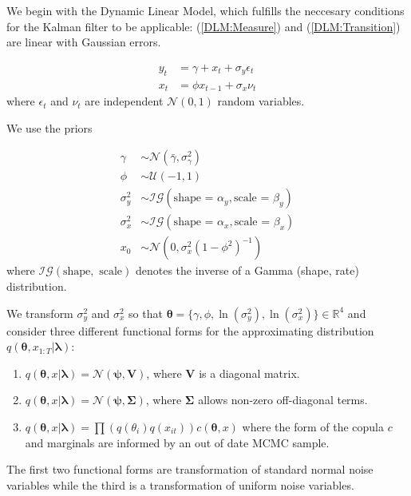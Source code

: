 \documentclass[12pt,a4paper]{article}%
\numberwithin{equation}{section}
\begin{document}
We begin with the Dynamic Linear Model, which fulfills the neccesary conditions for the Kalman filter to be applicable: (\ref{DLM:Measure}) and (\ref{DLM:Transition}) are linear with Gaussian errors.

\begin{align}
y_t &= \gamma + x_t + \sigma_y \epsilon_t \label{DLM:Measure}\\
x_t &= \phi x_{t-1} + \sigma_x \nu_t \label{DLM:Transition}
\end{align}
where $\epsilon_t$ and $\nu_t$ are independent $\mathcal{N}(0, 1)$ random variables.

We use the priors

\begin{align}
\gamma &\sim \mathcal{N}(\bar{\gamma}, \sigma^2_{\gamma}) \\
\phi &\sim \mathcal{U}(-1, 1) \\
\sigma^2_y &\sim \mathcal{IG}(\mbox{shape = }\alpha_y, \mbox{scale = }\beta_y) \\
\sigma^2_x &\sim \mathcal{IG}(\mbox{shape = }\alpha_x, \mbox{scale = }\beta_x) \\
x_0 &\sim \mathcal{N}(0, \sigma^2_x(1 - \phi^2)^{-1})
\end{align}
where $\mathcal{IG}(\mbox{shape}, \mbox{ scale})$ denotes the inverse of a Gamma (shape, rate) distribution.

We transform $\sigma^2_y$ and $\sigma^2_x$ so that $\boldsymbol{\theta} = \{\gamma, \phi, \ln(\sigma^2_y), \ln(\sigma^2_x) \} \in \mathbb{R}^4$ and consider three different functional forms for the approximating distribution $q(\boldsymbol{\theta}, x_{1:T} | \boldsymbol{\lambda})$:
\begin{enumerate}
\item $q(\boldsymbol{\theta}, x | \boldsymbol{\lambda}) = \mathcal{N}(\boldsymbol{\psi}, \textbf{V})$, where $\textbf{V}$ is a diagonal matrix.
\item $q(\boldsymbol{\theta}, x | \boldsymbol{\lambda}) = \mathcal{N}(\boldsymbol{\psi}, \boldsymbol{\Sigma})$, where $\boldsymbol{\Sigma}$ allows non-zero off-diagonal terms.
\item  $q(\boldsymbol{\theta}, x | \boldsymbol{\lambda}) = \prod \left(q(\theta_i) q(x_{it})\right) c(\boldsymbol{\theta}, x)$ where the form of the copula $c$ and marginals are informed by an out of date MCMC sample.
\end{enumerate}
The first two functional forms are transformation of standard normal noise variables while the third is a transformation of uniform noise variables.
\end{document}
